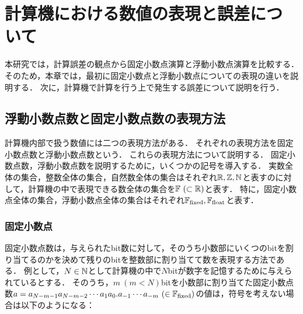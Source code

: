 \chapter{計算機における数値の表現と誤差について}
\label{chap:基礎知識1}
本研究では，計算誤差の観点から固定小数点演算と浮動小数点演算を比較する．
そのため，本章では，最初に固定小数点と浮動小数点についての表現の違いを説明する．
次に，計算機で計算を行う上で発生する誤差について説明を行う．

\section{浮動小数点数と固定小数点数の表現方法}
\label{sec:bg_float_fixed}
計算機内部で扱う数値には二つの表現方法がある．
それぞれの表現方法を固定小数点数と浮動小数点数という．
これらの表現方法について説明する．
固定小数点数，浮動小数点数を説明するために，いくつかの記号を導入する．
実数全体の集合，整数全体の集合，自然数全体の集合はそれぞれ$ \mathbb{R}, \mathbb{Z}, \mathbb{N}$と表すのに対して，計算機の中で表現できる数全体の集合を$\mathbb{F} \ (\subset \mathbb{R})$と表す．
特に，固定小数点全体の集合，浮動小数点全体の集合はそれぞれ$\mathbb{F}_{\text{fixed}},\mathbb{F}_{\text{float}}$と表す．



\subsection{固定小数点}
固定小数点数は，与えられたbit数に対して，そのうち小数部にいくつのbitを割り当てるのかを決めて残りのbitを整数部に割り当てて数を表現する方法である．
例として，$N \in \mathbb{N}$として計算機の中で$N$bitが数字を記憶するために与えられているとする．
そのうち，$m \ (m < N)$bitを小数部に割り当てた固定小数点数$a = a_{N-m-1} a_{N-m-2} \cdots a_1 a_0. a_{-1} \cdots a_{-m} \ (\in \mathbb{F}_{\text{fixed}})$の値は，符号を考えない場合は以下のようになる：

